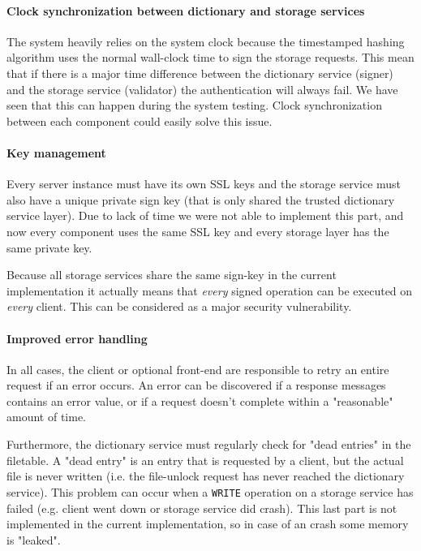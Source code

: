 \documentclass[12pt,a4paper]{scrartcl}
\begin{document}
\paragraph{Clock synchronization between dictionary and storage services}
The system heavily relies on the system clock because the timestamped hashing algorithm uses the normal wall-clock time to sign the storage requests. This mean that if there is a major time difference between the dictionary service (signer) and the storage service (validator) the authentication will always fail. We have seen that this can happen during the system testing. Clock synchronization between each component could easily solve this issue.

\paragraph{Key management}
Every server instance must have its own SSL keys and the storage service must also have a unique private sign key (that is only shared the trusted dictionary service layer). Due to lack of time we were not able to implement this part, and now every component uses the same SSL key and every storage layer has the same private key.

Because all storage services share the same sign-key in the current implementation it actually means that \emph{every} signed operation can be executed on \emph{every} client. This can be considered as a major security vulnerability.

\paragraph{Improved error handling}
In all cases, the client or optional front-end are responsible to retry an entire request if an error occurs. An error can be discovered if a response messages contains an error value, or if a request doesn't complete within a "reasonable" amount of time.

Furthermore, the dictionary service must regularly check for "dead entries" in the filetable. A "dead entry" is an entry that is requested by a client, but the actual file is never written (i.e. the file-unlock request has never reached the dictionary service). This problem can occur when a \verb|WRITE| operation on a storage service has failed (e.g. client went down or storage service did crash). This last part is not implemented in the current implementation, so in case of an crash some memory is "leaked".
\end{document}
